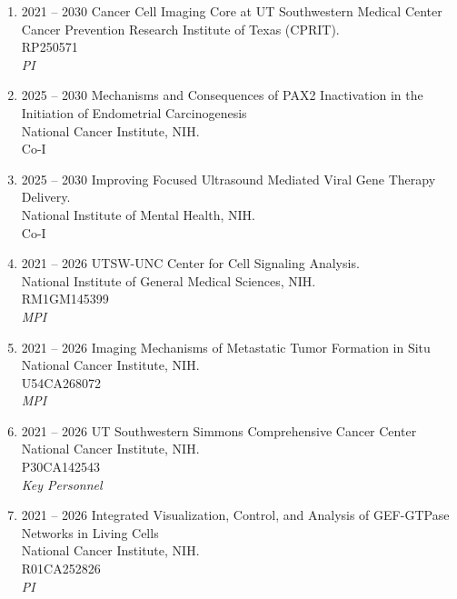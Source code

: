\begin{enumerate}
[leftmargin=!,
labelindent=0pt,
itemindent=-66pt,
label=\textbullet]

\item 2021 -- 2030 
\hspace{8pt}
Cancer Cell Imaging Core at UT Southwestern Medical Center \\
Cancer Prevention Research Institute of Texas (CPRIT). \\
RP250571 \\ 
{\it PI}


\item 2025 -- 2030 
\hspace{8pt}
Mechanisms and Consequences of PAX2 Inactivation in the Initiation of Endometrial Carcinogenesis \\
National Cancer Institute, NIH. \\
Co-I \\ 

\item 2025 -- 2030 
\hspace{8pt}
Improving Focused Ultrasound Mediated Viral Gene Therapy Delivery. \\
National Institute of Mental Health, NIH. \\
Co-I \\ 

\item 2021 -- 2026 
\hspace{8pt}
UTSW-UNC Center for Cell Signaling Analysis. \\
National Institute of General Medical Sciences, NIH. \\
RM1GM145399 \\ 
{\it MPI}

\item 2021 -- 2026 
\hspace{8pt}
Imaging Mechanisms of Metastatic Tumor Formation in Situ \\
National Cancer Institute, NIH. \\
U54CA268072 \\ 
{\it MPI}

\item 2021 -- 2026 
\hspace{8pt}
UT Southwestern Simmons Comprehensive Cancer Center \\
National Cancer Institute, NIH. \\
P30CA142543 \\ 
{\it Key Personnel}

\item 2021 -- 2026 
\hspace{8pt}
Integrated Visualization, Control, and Analysis of GEF-GTPase Networks in Living Cells \\
National Cancer Institute, NIH. \\
R01CA252826 \\ 
{\it PI}

\end{enumerate}

